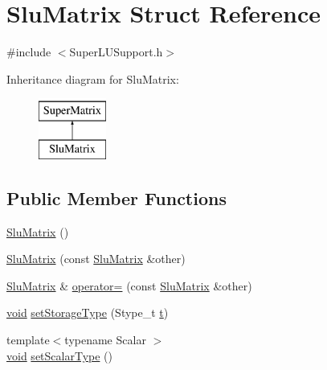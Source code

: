 \hypertarget{struct_slu_matrix}{\section{Slu\-Matrix Struct Reference}
\label{struct_slu_matrix}
}


{\ttfamily \#include $<$Super\-L\-U\-Support.\-h$>$}

Inheritance diagram for Slu\-Matrix\-:\begin{figure}[H]
\begin{center}
\leavevmode
\includegraphics[height=2.000000cm]{struct_slu_matrix}
\end{center}
\end{figure}
\subsection*{Public Member Functions}
\begin{DoxyCompactItemize}
\item 
\hyperlink{struct_slu_matrix_a574bcb05fd8245b340eeec89ede4da60}{Slu\-Matrix} ()
\item 
\hyperlink{struct_slu_matrix_a447a40050ccb330167d0bc6aeb743f0a}{Slu\-Matrix} (const \hyperlink{struct_slu_matrix}{Slu\-Matrix} \&other)
\item 
\hyperlink{struct_slu_matrix}{Slu\-Matrix} \& \hyperlink{struct_slu_matrix_ac427bef1a8ecd1a4fbb66aaa1e4873a0}{operator=} (const \hyperlink{struct_slu_matrix}{Slu\-Matrix} \&other)
\item 
\hyperlink{group___u_a_v_objects_plugin_ga444cf2ff3f0ecbe028adce838d373f5c}{void} \hyperlink{struct_slu_matrix_ac0cef47b944dccbbb25f3cdfa45ece61}{set\-Storage\-Type} (Stype\-\_\-t \hyperlink{glext_8h_a00140d6f5c548b26daf170bf16e86a6d}{t})
\item 
{\footnotesize template$<$typename Scalar $>$ }\\\hyperlink{group___u_a_v_objects_plugin_ga444cf2ff3f0ecbe028adce838d373f5c}{void} \hyperlink{struct_slu_matrix_a030e8fbbc97bd087c93f85cb2d983349}{set\-Scalar\-Type} ()
\end{DoxyCompactItemize}
